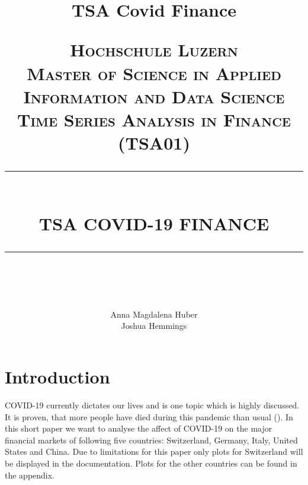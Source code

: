 \documentclass[11pt]{article}
\title{TSA Covid Finance}
\begin{document}


\newcommand{\HRule}[1]{\rule{\linewidth}{#1}}
\onehalfspacing
\setcounter{tocdepth}{5}
\setcounter{secnumdepth}{5}

\pagestyle{fancy}
\setlength\headheight{20pt}

\title{ \normalsize \textsc{Hochschule Luzern\\
Master of Science in Applied Information and Data Science \\
Time Series Analysis in Finance (TSA01)}
		\\ [8.0cm]
		\HRule{2pt} \\
		\LARGE \textbf{\uppercase{TSA COVID-19 Finance}}
		\HRule{2pt} \\ [3cm]
		\normalsize  \vspace*{10\baselineskip}}

\date{}

\author{
	Anna Magdalena Huber \\ 
    Joshua Hemmings }
\newpage
\maketitle

\clearpage


\section{Introduction}
COVID-19 currently dictates our lives and is one topic which is highly discussed. It is proven, that more people have died during this pandemic than usual (\cite{owidcoronavirus}). In this short paper we want to analyse the affect of COVID-19 on the major financial markets of following five countries: Switzerland, Germany, Italy, United States and China. Due to limitations for this paper only plots for Switzerland will be displayed in the documentation. Plots for the other countries can be found in the appendix.
\end{document}
